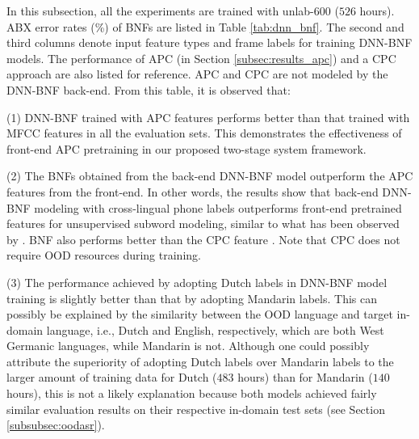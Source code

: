 \documentclass[a4paper]{article}
\begin{document}
In this subsection, all the experiments are trained with unlab-600 ($526$ hours).
ABX error rates (\%) of BNFs  are listed in Table \ref{tab:dnn_bnf}. The second and third columns  denote input feature types and frame labels for training DNN-BNF models.
The performance  of    APC (in Section \ref{subsec:results_apc}) and a CPC approach \cite{kahn2019librilight}  are also listed for reference.
APC and CPC are   not modeled by the DNN-BNF back-end.
   From this table, it is observed  that:

(1) DNN-BNF trained with APC features performs better than that trained with MFCC features in all the evaluation sets. This  demonstrates the effectiveness of front-end APC pretraining in our proposed two-stage system framework.

(2) The BNFs obtained from the back-end DNN-BNF model outperform the APC features from the front-end. In other words, the results show that
back-end DNN-BNF modeling with cross-lingual phone labels
outperforms front-end  pretrained features for unsupervised subword modeling, similar to what has been observed by \cite{shibata2017composite,feng2019_TASLP}. BNF also performs better than the   CPC feature    \cite{kahn2019librilight}. Note that CPC does not require OOD resources during training.

(3) The performance achieved by adopting Dutch labels in DNN-BNF model training is slightly better than that by adopting Mandarin labels. 
This can possibly be explained by the similarity between the OOD language and target in-domain language, i.e., Dutch and English, respectively, which are both West Germanic languages, while Mandarin is not. 
Although one could possibly attribute the superiority of adopting Dutch labels over Mandarin labels to the larger amount of training data for Dutch ($483$ hours) than for Mandarin ($140$ hours), this is not a likely explanation because both models achieved fairly similar evaluation results on their respective in-domain test sets (see Section \ref{subsubsec:oodasr}).
\end{document}
